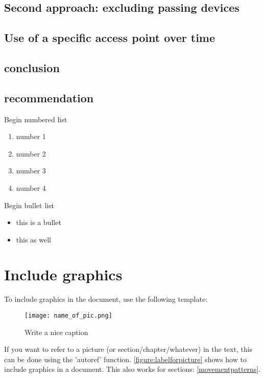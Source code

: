 \subsection{Second approach: excluding passing devices}
\subsection{Use of a specific access point over time}
\subsection{conclusion}
\subsection{recommendation}


Begin numbered list
\begin{enumerate}
\item number 1
\item number 2
\item number 3
\item number 4
\end{enumerate}
Begin bullet list
\begin{itemize}
\item this is a bullet
\item this as well
\end{itemize}


\section{Include graphics}
To include graphics in the document, use the following template:

\begin{figure}[H]
\centering
\texttt{[image: name\_of\_pic.png]}
\captionsetup{justification=centering}
\caption{Write a nice caption}
\label{figure:labelforpicture}
\end{figure}

If you want to refer to a picture (or section/chapter/whatever) in the text, this can be done using the 'autoref' function. \autoref{figure:labelforpicture} shows how to include graphics in a document. This also works for sections: \autoref{movementpatterns}.


